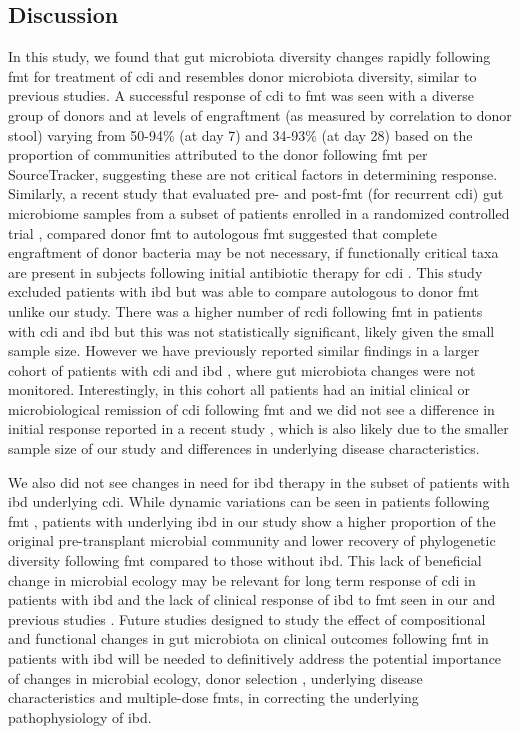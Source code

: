 \subsection{Discussion}
In this study, we found that gut microbiota diversity changes rapidly following \gls{fmt} for treatment of \gls{cdi} and resembles donor microbiota diversity, similar to previous studies. A successful response of \gls{cdi} to \gls{fmt} was seen with a diverse group of donors and at levels of engraftment (as measured by correlation to donor stool) varying from 50-94\% (at day 7) and 34-93\% (at day 28) based on the proportion of communities attributed to the donor following \gls{fmt} per SourceTracker, suggesting these are not critical factors in determining response.  Similarly, a recent study that evaluated pre- and post-\gls{fmt} (for recurrent \gls{cdi}) gut microbiome samples from a subset of patients enrolled in a randomized controlled trial \cite{RN1527}, compared donor \gls{fmt} to autologous \gls{fmt} suggested that complete engraftment of donor bacteria may be not necessary, if functionally critical taxa are present in subjects following initial antibiotic therapy for \gls{cdi} \cite{RN1524}. This study excluded patients with \gls{ibd} but was able to compare autologous to donor \gls{fmt} unlike our study. There was a higher number of \gls{rcdi} following \gls{fmt} in patients with \gls{cdi} and \gls{ibd} but this was not statistically significant, likely given the small sample size. However we have previously reported similar findings in a larger cohort of patients with \gls{cdi} and \gls{ibd} \cite{RN1498}, where gut microbiota changes were not monitored. Interestingly, in this cohort all patients had an initial clinical or microbiological remission of \gls{cdi} following \gls{fmt} and we did not see a difference in initial response reported in a recent study \cite{RN1497}, which is also likely due to the smaller sample size of our study and differences in underlying disease characteristics. 

We also did not see changes in need for \gls{ibd} therapy in the subset of patients with \gls{ibd} underlying \gls{cdi}. While dynamic variations can be seen in patients following \gls{fmt} \cite{RN1471}, patients with underlying \gls{ibd} in our study show a higher proportion of the original pre-transplant microbial community and lower recovery of phylogenetic diversity following \gls{fmt} compared to those without \gls{ibd}. This lack of beneficial change in microbial ecology may be relevant for long term response of \gls{cdi} in patients with \gls{ibd} and the lack of clinical response of \gls{ibd} to \gls{fmt} seen in our and previous studies \cite{RN1497}. Future studies designed to study the effect of compositional and functional changes in gut microbiota on clinical outcomes following \gls{fmt} in patients with \gls{ibd} will be needed to definitively address the potential importance of changes in microbial ecology, donor selection \cite{RN3982}, underlying disease characteristics and multiple-dose \glspl{fmt}, in correcting the underlying pathophysiology of \gls{ibd}. 

